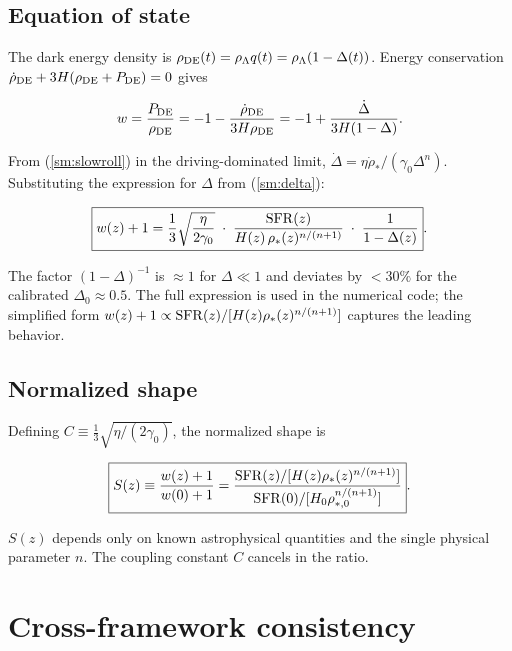 \documentclass[12pt,a4paper]{article}
\begin{document}
\subsection{Equation of state}

The dark energy density is $\rho_{\rm DE}(t)=\rho_\Lambda q(t)=\rho_\Lambda(1-\Delta(t))$. Energy conservation $\dot{\rho}_{\rm DE}+3H(\rho_{\rm DE}+P_{\rm DE})=0$ gives

\begin{equation}
w = \frac{P_{\rm DE}}{\rho_{\rm DE}} = -1 - \frac{\dot{\rho}_{\rm DE}}{3H\rho_{\rm DE}} = -1 + \frac{\dot{\Delta}}{3H(1-\Delta)}.
\end{equation}

From (\ref{sm:slowroll}) in the driving-dominated limit, $\dot{\Delta}=\eta\dot{\rho}_*/(\gamma_0\Delta^n)$. Substituting the expression for $\Delta$ from (\ref{sm:delta}):

\begin{equation}
\boxed{w(z)+1 = \frac{1}{3}\sqrt{\frac{\eta}{2\gamma_0}}\;\cdot\;\frac{{\rm SFR}(z)}{H(z)\,\rho_*(z)^{n/(n+1)}}\;\cdot\;\frac{1}{1-\Delta(z)}}.
\end{equation}

The factor $(1-\Delta)^{-1}$ is $\approx1$ for $\Delta\ll1$ and deviates by $<30\%$ for the calibrated $\Delta_0\approx0.5$. The full expression is used in the numerical code; the simplified form $w(z)+1\propto{\rm SFR}(z)/[H(z)\rho_*(z)^{n/(n+1)}]$ captures the leading behavior.

\subsection{Normalized shape}

Defining $C\equiv\frac{1}{3}\sqrt{\eta/(2\gamma_0)}$, the normalized shape is

\begin{equation}
\boxed{S(z)\equiv\frac{w(z)+1}{w(0)+1} = \frac{{\rm SFR}(z)/[H(z)\rho_*(z)^{n/(n+1)}]}{{\rm SFR}(0)/[H_0\rho_{*,0}^{n/(n+1)}]}}.
\end{equation}

$S(z)$ depends only on known astrophysical quantities and the single physical parameter $n$. The coupling constant $C$ cancels in the ratio.

\section{Cross-framework consistency}
\end{document}
